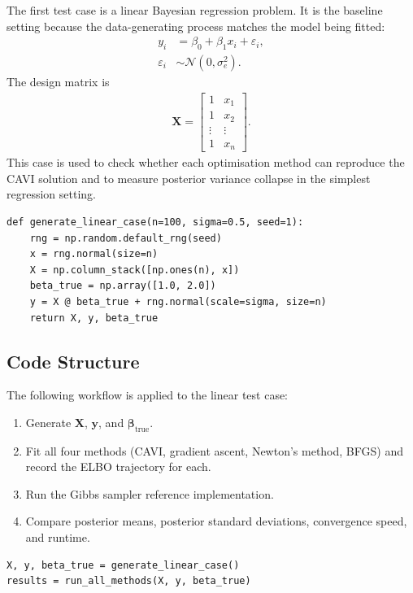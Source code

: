 \documentclass[11pt,a4paper]{article}
\newcommand{\N}{\mathcal{N}}
\begin{document}
The first test case is a linear Bayesian regression problem. It is the baseline setting because the data-generating process matches the model being fitted:
\begin{align}
y_i &= \beta_0 + \beta_1 x_i + \varepsilon_i,\\
\varepsilon_i &\sim \N(0,\sigma_e^2).
\end{align}
The design matrix is
\begin{align}
\bm{X} =
\begin{bmatrix}
1 & x_1\\
1 & x_2\\
\vdots & \vdots\\
1 & x_n
\end{bmatrix}.
\end{align}
This case is used to check whether each optimisation method can reproduce the CAVI solution and to measure posterior variance collapse in the simplest regression setting.

\begin{verbatim}
def generate_linear_case(n=100, sigma=0.5, seed=1):
    rng = np.random.default_rng(seed)
    x = rng.normal(size=n)
    X = np.column_stack([np.ones(n), x])
    beta_true = np.array([1.0, 2.0])
    y = X @ beta_true + rng.normal(scale=sigma, size=n)
    return X, y, beta_true
\end{verbatim}

\subsection{Code Structure}

The following workflow is applied to the linear test case:
\begin{enumerate}
\item Generate $\bm{X}$, $\bm{y}$, and $\bm{\beta}_{\mathrm{true}}$.
\item Fit all four methods (CAVI, gradient ascent, Newton's method, BFGS) and record the ELBO trajectory for each.
\item Run the Gibbs sampler reference implementation.
\item Compare posterior means, posterior standard deviations, convergence speed, and runtime.
\end{enumerate}

\begin{verbatim}
X, y, beta_true = generate_linear_case()
results = run_all_methods(X, y, beta_true)
\end{verbatim}
\end{document}
